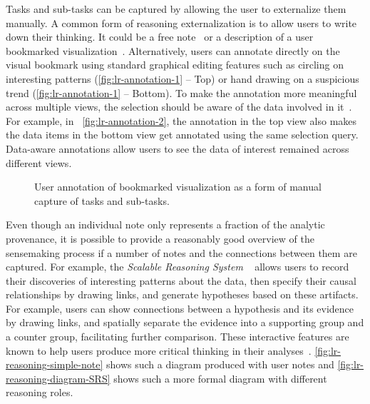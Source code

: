 Tasks and sub-tasks can be captured by allowing the user to externalize them manually. A common form of reasoning externalization is to allow users to write down their thinking. It could be a free note~\cite{Shrinivasan2008} or a description of a user bookmarked visualization~\cite{Heer2009,Walker2013}. Alternatively, users can annotate directly on the visual bookmark using standard graphical editing features such as circling on interesting patterns (\autoref{fig:lr-annotation-1} -- Top) or hand drawing on a suspicious trend (\autoref{fig:lr-annotation-1} -- Bottom). To make the annotation more meaningful across multiple views, the selection should be aware of the data involved in it~\cite{Heer2008a}. For example, in~ \autoref{fig:lr-annotation-2}, the annotation in the top view also makes the data items in the bottom view get annotated using the same selection query. Data-aware annotations allow users to see the data of interest remained across different views.

\begin{figure}[!htb]
\centering
{} 
\hspace{1cm}
\caption[User annotation of bookmarked visualization]{User annotation of bookmarked visualization as a form of manual capture of tasks and sub-tasks. }
\label{fig:lr-annotation}
\end{figure}

Even though an individual note only represents a fraction of the analytic provenance, it is possible to provide a reasonably good overview of the sensemaking process if a number of notes and the connections between them are captured. For example, the \emph{Scalable Reasoning System} ~\cite{Pike2009} allows users to record their discoveries of interesting patterns about the data, then specify their causal relationships by drawing links, and generate hypotheses based on these artifacts. For example, users can show connections between a hypothesis and its evidence by drawing links, and spatially separate the evidence into a supporting group and a counter group, facilitating further comparison. These interactive features are known to help users produce more critical thinking in their analyses~\cite{Sedig2013}.  \autoref{fig:lr-reasoning-simple-note} shows such a diagram produced with user notes and \autoref{fig:lr-reasoning-diagram-SRS} shows such a more formal diagram with different reasoning roles.

